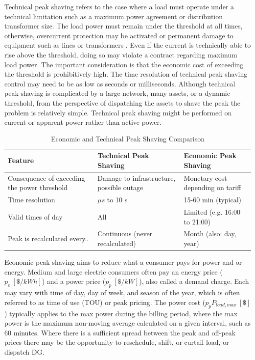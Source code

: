\documentclass[journal,article,submit,pdftex,moreauthors]{Definitions/mdpi}
\begin{document}
Technical peak shaving refers to the case where a load must operate under a technical limitation such as a maximum power agreement or distribution transformer size. The load power must remain under the threshold at all times, otherwise, overcurrent protection may be activated or permanent damage to equipment such as lines or transformers \cite{Greco2023}. Even if the current is technically able to rise above the threshold, doing so may violate a contract regarding maximum load power. The important consideration is that the economic cost of exceeding the threshold is prohibitively high. The time resolution of technical peak shaving control may need to be as low as seconds or milliseconds. Although technical peak shaving is complicated by a large network, many assets, or a dynamic threshold, from the perspective of dispatching the assets to shave the peak the problem is relatively simple. Technical peak shaving might be performed on current or apparent power rather than active power.

\begin{table}
  \caption{Economic and Technical Peak Shaving Comparison}
  \label{tab:econ-tech-peak-shaving}
  \begin{tabularx}{\linewidth}{X X X}
    \toprule
    Feature                                      & Technical Peak Shaving                    & Economic Peak Shaving             \\
    \midrule
    Consequence of exceeding the power threshold & Damage to infrastructure, possible outage & Monetary cost depending on tariff \\
    Time resolution                              & $\mu s$ to 10 s                           & 15-60 min (typical)               \\
    Valid times of day                           & All                                       & Limited (e.g. 16:00 to 21:00)     \\
    Peak is recalculated every..                 & Continuous (never recalculated)           & Month (also: day, year)           \\
    \bottomrule
  \end{tabularx}
\end{table}


Economic peak shaving aims to reduce what a consumer pays for power and or energy. Medium and large electric consumers often pay an energy price ($p_e\ [\$/kWh]$) and a power price ($p_p\ [\$/kW]$), also called a demand charge. Each may vary with time of day, day of week, and season of the year, which is often referred to as time of use (TOU) or peak pricing. The power cost ($p_p P_{load,max}\ [\$]$) typically applies to the max power during the billing period, where the max power is the maximum non-moving average calculated on a given interval, such as 60 minutes. Where there is a sufficient spread between the peak and off-peak prices there may be the opportunity to reschedule, shift, or curtail load, or dispatch DG.
\end{document}

